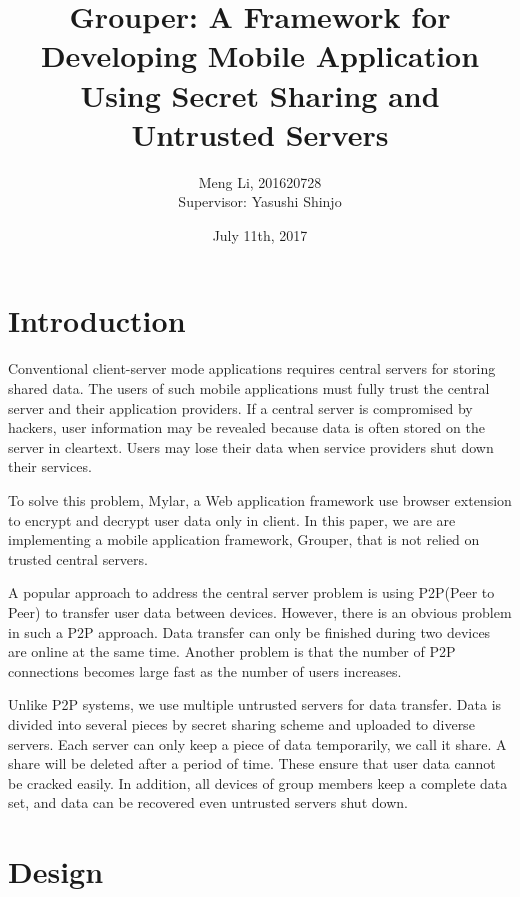 \documentclass[twocolumn,10pt]{article}
\begin{document}
\date{July 11th, 2017}

\title{\bf Grouper: A Framework for Developing Mobile Application Using Secret Sharing and Untrusted Servers}

\author{
	Meng Li, 201620728  
	\\ Supervisor: Yasushi Shinjo
}

\maketitle

\section{Introduction}
Conventional client-server mode applications requires central servers for storing shared data. The users of such mobile applications must fully trust the central server and their application providers. If a central server is compromised by hackers, user information may be revealed because data is often stored on the server in cleartext. Users may lose their data when service providers shut down their services. 

To solve this problem, Mylar\cite{popa2014building}, a Web application framework use browser extension to encrypt and decrypt user data only in client. In this paper, we are are implementing a mobile application framework, Grouper, that is not relied on trusted central servers.

A popular approach to address the central server problem is using P2P(Peer to Peer) to transfer user data between devices. However, there is an obvious problem in such a P2P approach. Data transfer can only be finished during two devices are online at the same time. Another problem is that the number of P2P connections becomes large  fast as the number of users increases. 

Unlike P2P systems, we use multiple untrusted servers for data transfer. Data is divided into several pieces by secret sharing scheme and uploaded to diverse servers. Each server can only keep a piece of data temporarily, we call it share. A share will be deleted after a period of time. These ensure that user data cannot be cracked easily. In addition, all devices of group members keep a complete data set, and data can be recovered even untrusted servers shut down.

\section{Design}
\end{document}
